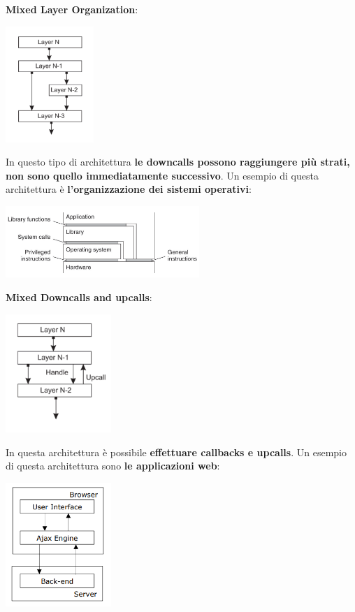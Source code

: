 \documentclass[12pt]{article}
\begin{document}
\textbf{Mixed Layer Organization}:
\begin{center}
    \includegraphics[width = 0.25\textwidth]{Images/6.PNG}
\end{center}
In questo tipo di architettura \textbf{le downcalls possono raggiungere più strati, non sono quello immediatamente successivo}. Un esempio di questa architettura è \textbf{l'organizzazione dei sistemi operativi}:
\begin{center}
    \includegraphics[width = 0.55\textwidth]{Images/7.PNG}
\end{center}
\textbf{Mixed Downcalls and upcalls}:
\begin{center}
    \includegraphics[width = 0.30\textwidth]{Images/8.PNG}
\end{center}
In questa architettura è possibile \textbf{effettuare callbacks e upcalls}. Un esempio di questa architettura sono \textbf{le applicazioni web}:
\begin{center}
    \includegraphics[width = 0.30\textwidth]{Images/9.PNG}
\end{center}
\end{document}
